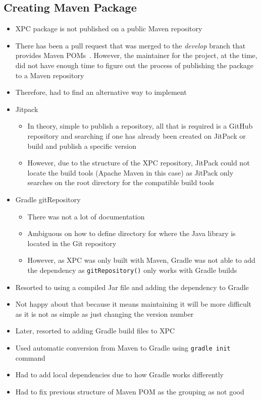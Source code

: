 \documentclass[../dissertation.tex]{subfiles}
\begin{document}
\subsection{Creating Maven Package}
\begin{itemize}
  \item XPC package is not published on a public Maven repository
  \item There has been a pull request that was merged to the \textit{develop} branch
    that provides Maven POMs~\cite{xpc:pom}. However, the maintainer for the
    project, at the time, did not have enough time to figure out the process of
    publishing the package to a Maven repository~\cite{xpc:pom-time}
  \item Therefore, had to find an alternative way to implement
  \item Jitpack~\cite{jitpack}
  \begin{itemize}
    \item In theory, simple to publish a repository, all that is required is a GitHub
      repository and searching if one has already been created on JitPack or build and publish
      a specific version
    \item However, due to the structure of the XPC repository, JitPack could not locate the
      build tools (Apache Maven in this case) as JitPack only searches on the root directory
      for the compatible build tools
  \end{itemize}
  \item Gradle gitRepository~\cite{gradle:gitRepository}
  \begin{itemize}
    \item There was not a lot of documentation
    \item Ambiguous on how to define directory for where the Java library is located in the Git repository
    \item However, as XPC was only built with Maven, Gradle was not able to add the dependency as \lstinline|gitRepository()|
      only works with Gradle builds~\cite{gradle:gitRepoGradleOnly}
  \end{itemize}
\item Resorted to using a compiled Jar file and adding the dependency to Gradle
\item Not happy about that because it means maintaining it will be more difficult as
  it is not as simple as just changing the version number
\item Later, resorted to adding Gradle build files to XPC
\item Used automatic conversion from Maven to Gradle using \lstinline|gradle init| command~\cite{gradle:migratePOM}
\item Had to add local dependencies due to how Gradle works differently
\item Had to fix previous structure of Maven POM as the grouping as not good
\end{itemize}
\end{document}
